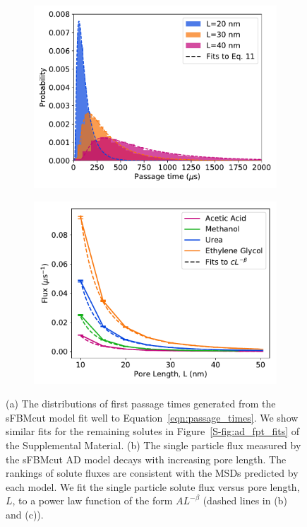 \documentclass[aps,pre,preprint,groupedaddress,longbibliography]{revtex4-2}
\begin{document}
  \begin{figure}
  \centering
  \begin{subfigure}{0.485\textwidth}
  \includegraphics[width=\textwidth]{fpt_distributions.pdf}
  \caption{}\label{fig:fpt_distributions}
  \end{subfigure}
  \begin{subfigure}{0.485\textwidth}
  \includegraphics[width=\textwidth]{flux_curves.pdf}
  \caption{}\label{fig:flux_curves_ad}
  \end{subfigure}
  \caption{(a) The distributions of first passage times generated from the
	  sFBMcut model fit well to Equation~\ref{eqn:passage_times}. We show
	  similar fits for the remaining solutes in
	  Figure~\ref{S-fig:ad_fpt_fits} of the Supplemental Material. (b) The
	  single particle flux measured by the sFBMcut AD model decays with
	  increasing pore length. The rankings of solute fluxes are consistent
	  with the MSDs predicted by each model. We fit the single particle
	  solute flux versus pore length, $L$, to a power law function of the
	  form $AL^{-\beta}$ (dashed lines in (b) and (c)). 
  }\label{fig:flux_curves}
  \end{figure}
\end{document}
